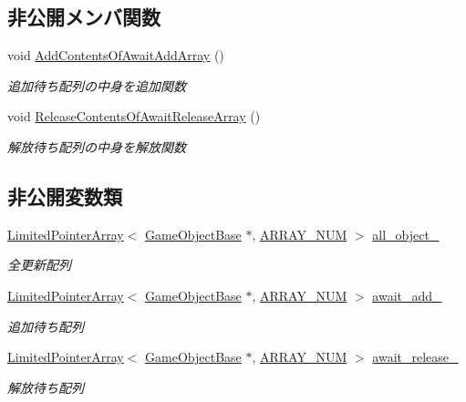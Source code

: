 \subsection*{非公開メンバ関数}
\begin{DoxyCompactItemize}
\item 
void \mbox{\hyperlink{class_update_manager_a7bb1af3bffcc4d72333ac86ae411891e}{Add\+Contents\+Of\+Await\+Add\+Array}} ()
\begin{DoxyCompactList}\small\item\em 追加待ち配列の中身を追加関数 \end{DoxyCompactList}\item 
void \mbox{\hyperlink{class_update_manager_ac87db8037fbfb800187c50ca22a1f01d}{Release\+Contents\+Of\+Await\+Release\+Array}} ()
\begin{DoxyCompactList}\small\item\em 解放待ち配列の中身を解放関数 \end{DoxyCompactList}\end{DoxyCompactItemize}
\subsection*{非公開変数類}
\begin{DoxyCompactItemize}
\item 
\mbox{\hyperlink{class_limited_pointer_array}{Limited\+Pointer\+Array}}$<$ \mbox{\hyperlink{class_game_object_base}{Game\+Object\+Base}} $\ast$, \mbox{\hyperlink{class_update_manager_a280b884fb6a025cfd92d4f93086c60c6}{A\+R\+R\+A\+Y\+\_\+\+N\+UM}} $>$ \mbox{\hyperlink{class_update_manager_a3943ecea6d685d2aba94dc227a911b52}{all\+\_\+object\+\_\+}}
\begin{DoxyCompactList}\small\item\em 全更新配列 \end{DoxyCompactList}\item 
\mbox{\hyperlink{class_limited_pointer_array}{Limited\+Pointer\+Array}}$<$ \mbox{\hyperlink{class_game_object_base}{Game\+Object\+Base}} $\ast$, \mbox{\hyperlink{class_update_manager_a280b884fb6a025cfd92d4f93086c60c6}{A\+R\+R\+A\+Y\+\_\+\+N\+UM}} $>$ \mbox{\hyperlink{class_update_manager_a0e499225c229fa9f6ae4c8b1f4ae409c}{await\+\_\+add\+\_\+}}
\begin{DoxyCompactList}\small\item\em 追加待ち配列 \end{DoxyCompactList}\item 
\mbox{\hyperlink{class_limited_pointer_array}{Limited\+Pointer\+Array}}$<$ \mbox{\hyperlink{class_game_object_base}{Game\+Object\+Base}} $\ast$, \mbox{\hyperlink{class_update_manager_a280b884fb6a025cfd92d4f93086c60c6}{A\+R\+R\+A\+Y\+\_\+\+N\+UM}} $>$ \mbox{\hyperlink{class_update_manager_aea92aeda54d22c039d1bb97387e6743c}{await\+\_\+release\+\_\+}}
\begin{DoxyCompactList}\small\item\em 解放待ち配列 \end{DoxyCompactList}\end{DoxyCompactItemize}


